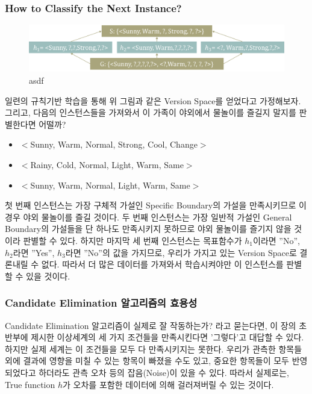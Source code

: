 \documentclass[a4paper]{oblivoir}
\begin{document}
\subsubsection{How to Classify the Next Instance?}
\begin{figure}[ht]
\centering
\includegraphics[scale=0.5]{Candidate_Elimination4.png}
\caption{asdf}
\label{Figure 2-10}
\end{figure}
일련의 규칙기반 학습을 통해 위 그림과 같은 Version Space를 얻었다고 가정해보자. 그리고, 다음의 인스턴스들을 가져와서 이 가족이 야외에서 물놀이를 즐길지 말지를 판별한다면 어떨까?
\begin{itemize}\setlength\itemsep{-\parsep}
	\item $<$Sunny, Warm, Normal, Strong, Cool, Change$>$
	\item $<$Rainy, Cold, Normal, Light, Warm, Same$>$
	\item $<$Sunny, Warm, Normal, Light, Warm, Same$>$
\end{itemize}

\indent 첫 번째 인스턴스는 가장 구체적 가설인 Specific Boundary의 가설을 만족시키므로 이 경우 야외 물놀이를 즐길 것이다. 두 번째 인스턴스는 가장 일반적 가설인 General Boundary의 가설들을 단 하나도 만족시키지 못하므로 야외 물놀이를 즐기지 않을 것이라 판별할 수 있다. 하지만 마지막 세 번째 인스턴스는  목표함수가 $h_{1}$이라면 ''No'', $h_{2}$라면 ''Yes'', $h_{3}$라면 ''No''의 값을 가지므로, 우리가 가지고 있는 Version Space로 결론내릴 수 없다. 따라서 더 많은 데이터를 가져와서 학습시켜야만 이 인스턴스를 판별할 수 있을 것이다. \\

\subsubsection{Candidate Elimination 알고리즘의 효용성}
Candidate Elimination 알고리즘이 실제로 잘 작동하는가? 라고 묻는다면, 이 장의 초반부에 제시한 이상세계의 세 가지 조건들을 만족시킨다면 '그렇다'고 대답할 수 있다. 하지만 실제 세계는 이 조건들을 모두 다 만족시키지는 못한다. 우리가 관측한 항목들 외에 결과에 영향을 미칠 수 있는 항목이 빠졌을 수도 있고, 중요한 항목들이 모두 반영되었다고 하더라도 관측 오차 등의 잡음(Noise)이 있을 수 있다. 따라서 실제로는, True function $h$가 오차를 포함한 데이터에 의해 걸러져버릴 수 있는 것이다.
\end{document}
